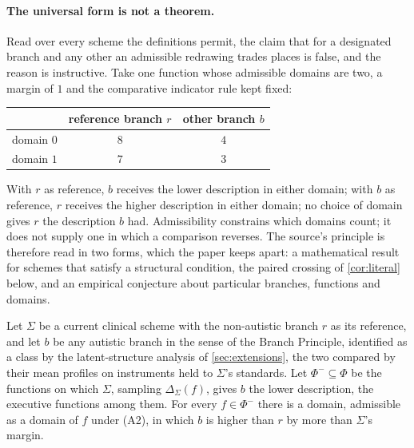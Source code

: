 \paragraph{The universal form is not a theorem.} Read over every scheme the definitions permit, the claim that for a designated branch and any other an admissible redrawing trades places is false, and the reason is instructive. Take one function whose admissible domains are two, a margin of $1$ and the comparative indicator rule kept fixed:
\begin{center}
\small
\begin{tabular}{@{}lcc@{}}
\toprule
& reference branch $r$ & other branch $b$ \\
\midrule
domain $0$ & $8$ & $4$ \\
domain $1$ & $7$ & $3$ \\
\bottomrule
\end{tabular}
\end{center}
With $r$ as reference, $b$ receives the lower description in either domain; with $b$ as reference, $r$ receives the higher description in either domain; no choice of domain gives $r$ the description $b$ had. Admissibility constrains which domains count; it does not supply one in which a comparison reverses. The source's principle is therefore read in two forms, which the paper keeps apart: a mathematical result for schemes that satisfy a structural condition, the paired crossing of \autoref{cor:literal} below, and an empirical conjecture about particular branches, functions and domains.

\begin{conjecture}
\label{conj:scheme-symmetry}
Let $\Sigma$ be a current clinical scheme with the non-autistic branch $r$ as its reference, and let $b$ be any autistic branch in the sense of the Branch Principle, identified as a class by the latent-structure analysis of \autoref{sec:extensions}, the two compared by their mean profiles on instruments held to $\Sigma$'s standards. Let $\Phi^{-} \subseteq \Phi$ be the functions on which $\Sigma$, sampling $\Delta_\Sigma(f)$, gives $b$ the lower description, the executive functions among them. For every $f \in \Phi^{-}$ there is a domain, admissible as a domain of $f$ under (A2), in which $b$ is higher than $r$ by more than $\Sigma$'s margin.
\end{conjecture}

